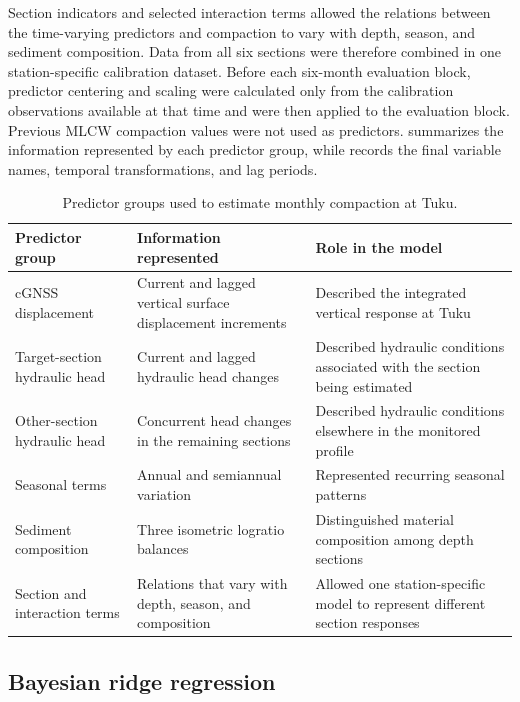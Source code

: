 Section indicators and selected interaction terms allowed the relations between the time-varying predictors and compaction to vary with depth, season, and sediment composition. Data from all six sections were therefore combined in one station-specific calibration dataset. Before each six-month evaluation block, predictor centering and scaling were calculated only from the calibration observations available at that time and were then applied to the evaluation block. Previous MLCW compaction values were not used as predictors.  summarizes the information represented by each predictor group, while  records the final variable names, temporal transformations, and lag periods.

\begin{table}[htbp]
  \centering
  \small
  \renewcommand{\arraystretch}{1.15}
  \caption{Predictor groups used to estimate monthly compaction at Tuku.}
  \label{tab:predictor_summary}
  \begin{tabularx}{\textwidth}{@{}p{}p{}X@{}}
    \toprule
    \textbf{Predictor group} & \textbf{Information represented} & \textbf{Role in the model} \\
    \midrule
    cGNSS displacement & Current and lagged vertical surface displacement increments & Described the integrated vertical response at Tuku \\
    Target-section hydraulic head & Current and lagged hydraulic head changes & Described hydraulic conditions associated with the section being estimated \\
    Other-section hydraulic head & Concurrent head changes in the remaining sections & Described hydraulic conditions elsewhere in the monitored profile \\
    Seasonal terms & Annual and semiannual variation & Represented recurring seasonal patterns \\
    Sediment composition & Three isometric logratio balances & Distinguished material composition among depth sections \\
    Section and interaction terms & Relations that vary with depth, season, and composition & Allowed one station-specific model to represent different section responses \\
    \bottomrule
  \end{tabularx}
\end{table}

\subsection{Bayesian ridge regression}
\label{subsec:bayesian_ridge}


